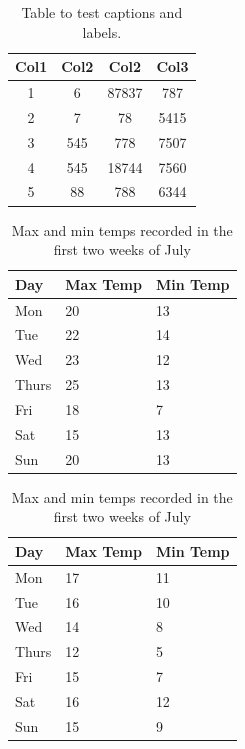 \documentclass[a4paper,11pt]{report}    %
\begin{document}
\begin{table}[H]
\centering
\begin{tabular}{||c c c c||} 
 \hline
 Col1 & Col2 & Col2 & Col3 \\ [0.5ex] 
 \hline\hline
 1 & 6 & 87837 & 787 \\ 
 2 & 7 & 78 & 5415 \\
 3 & 545 & 778 & 7507 \\
 4 & 545 & 18744 & 7560 \\
 5 & 88 & 788 & 6344 \\ [1ex] 
 \hline
\end{tabular}
\caption{Table to test captions and labels.}
\label{table:1}
\end{table}

\begin{table}[H]
    \begin{subtable}[h]{0.45\textwidth}
        \centering
        \begin{tabular}{l | l | l}
        Day & Max Temp & Min Temp \\
        \hline \hline
        Mon & 20 & 13\\
        Tue & 22 & 14\\
        Wed & 23 & 12\\
        Thurs & 25 & 13\\
        Fri & 18 & 7\\
        Sat & 15 & 13\\
        Sun & 20 & 13
       \end{tabular}
       \caption{First Week}
       \label{subtab:week1}
    \end{subtable}%
    \hfill
    \begin{subtable}[h]{0.45\textwidth}
        \centering
        \begin{tabular}{l | l | l}
        Day & Max Temp & Min Temp \\
        \hline \hline
        Mon & 17 & 11\\
        Tue & 16 & 10\\
        Wed & 14 & 8\\
        Thurs & 12 & 5\\
        Fri & 15 & 7\\
        Sat & 16 & 12\\
        Sun & 15 & 9
        \end{tabular}
        \caption{Second Week}
        \label{subtab:week2}
     \end{subtable}
     \caption{Max and min temps recorded in the first two weeks of July}
     \label{tab:temps}
\end{table}
\end{document}
